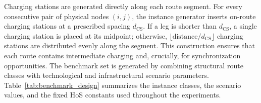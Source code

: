 \documentclass[3p,11pt,authoryear]{elsarticle}  %
\begin{document}
Charging stations are generated directly along each route segment. For every consecutive pair of physical nodes \((i,j)\), the instance generator inserts on-route charging stations at a prescribed spacing \(d_{\text{CS}}\). If a leg is shorter than \(d_{\text{CS}}\), a single charging station is placed at its midpoint; otherwise, \(\lfloor \text{distance}/d_{\text{CS}} \rfloor\) charging stations are distributed evenly along the segment. This construction ensures that each route contains intermediate charging and, crucially, for synchronization opportunities. The benchmark set is generated by combining structural route classes with technological and infrastructural scenario parameters. Table~\ref{tab:benchmark_design} summarizes the instance classes, the scenario values, and the fixed HoS constants used throughout the experiments. 





\end{document}
